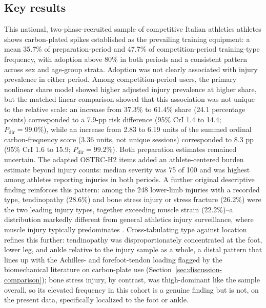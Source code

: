 \subsection{Key results}
\label{sec:discussion-key}
This national, two-phase-recruited sample of competitive Italian athletics athletes shows carbon-plated spikes established as the prevailing training equipment: a mean 35.7\% of preparation-period and 47.7\% of competition-period training-type frequency, with adoption above 80\% in both periods and a consistent pattern across sex and age-group strata. Adoption was not clearly associated with injury prevalence in either period. Among competition-period users, the primary nonlinear share model showed higher adjusted injury prevalence at higher share, but the matched linear comparison showed that this association was not unique to the relative scale: an increase from 37.3\% to 61.4\% share (24.1 percentage points) corresponded to a 7.9-pp risk difference (95\% CrI 1.4 to 14.4; $P_{\mathrm{dir}}=99.0\%$), while an increase from 2.83 to 6.19 units of the summed ordinal carbon-frequency score (3.36 units, not unique sessions) corresponded to 8.3 pp (95\% CrI 1.6 to 15.9; $P_{\mathrm{dir}}=99.2\%$). Both preparation estimates remained uncertain. The adapted OSTRC-H2 items added an athlete-centered burden estimate beyond injury counts: median severity was 75 of 100 and was highest among athletes reporting injuries in both periods. A further original descriptive finding reinforces this pattern: among the 248 lower-limb injuries with a recorded type, tendinopathy (28.6\%) and bone stress injury or stress fracture (26.2\%) were the two leading injury types, together exceeding muscle strain (22.2\%)--a distribution markedly different from general athletics injury surveillance, where muscle injury typically predominates \citep{edouard2020injury}. Cross-tabulating type against location refines this further: tendinopathy was disproportionately concentrated at the foot, lower leg, and ankle relative to the injury sample as a whole, a distal pattern that lines up with the Achilles- and forefoot-tendon loading flagged by the biomechanical literature on carbon-plate use (Section~\ref{sec:discussion-comparison}); bone stress injury, by contrast, was thigh-dominant like the sample overall, so its elevated frequency in this cohort is a genuine finding but is not, on the present data, specifically localized to the foot or ankle.

